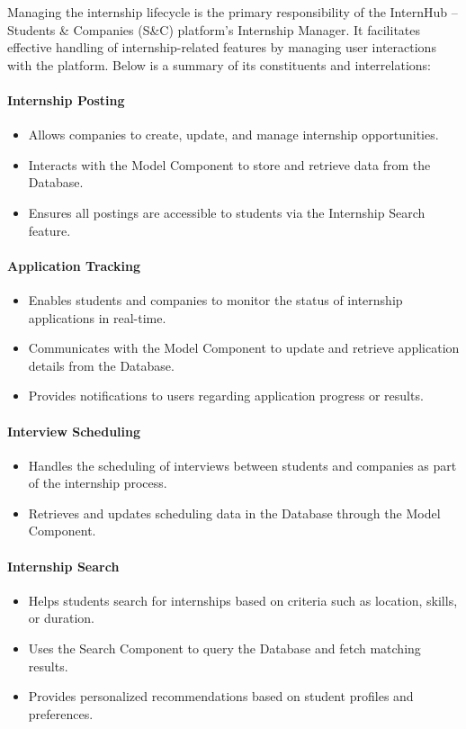 Managing the internship lifecycle is the primary responsibility of the InternHub – Students \& Companies (S\&C) platform's Internship Manager. It facilitates effective handling of internship-related features by managing user interactions with the platform. Below is a summary of its constituents and interrelations:

\paragraph{Internship Posting}
\begin{itemize}
    \item Allows companies to create, update, and manage internship opportunities.
    \item Interacts with the Model Component to store and retrieve data from the Database.
    \item Ensures all postings are accessible to students via the Internship Search feature.
\end{itemize}

\paragraph{Application Tracking}
\begin{itemize}
    \item Enables students and companies to monitor the status of internship applications in real-time.
    \item Communicates with the Model Component to update and retrieve application details from the Database.
    \item Provides notifications to users regarding application progress or results.
\end{itemize}

\paragraph{Interview Scheduling}
\begin{itemize}
    \item Handles the scheduling of interviews between students and companies as part of the internship process.
    \item Retrieves and updates scheduling data in the Database through the Model Component.
\end{itemize}

\paragraph{Internship Search}
\begin{itemize}
    \item Helps students search for internships based on criteria such as location, skills, or duration.
    \item Uses the Search Component to query the Database and fetch matching results.
    \item Provides personalized recommendations based on student profiles and preferences.
\end{itemize}

